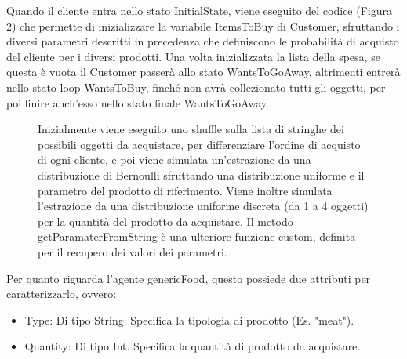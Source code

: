 \documentclass{article}
\begin{document}
Quando il cliente entra nello stato InitialState, viene eseguito del codice (Figura 2) che permette di inizializzare la variabile ItemsToBuy di Customer, sfruttando i diversi parametri descritti in precedenza che definiscono le probabilità di acquisto del cliente per i diversi prodotti.
\newline
\newline
Una volta inizializzata la lista della spesa, se questa è vuota il Customer passerà allo stato WantsToGoAway, altrimenti entrerà nello stato loop WantsToBuy, finché non avrà collezionato tutti gli oggetti, per poi finire anch'esso nello stato finale WantsToGoAway.
\begin{center}
\begin{figure}[h]
\label{init}

\caption{\footnotesize{Inizialmente viene eseguito uno shuffle sulla lista di stringhe dei possibili oggetti da acquistare, per differenziare l'ordine di acquisto di ogni cliente, e poi viene simulata un'estrazione da una distribuzione di Bernoulli sfruttando una distribuzione uniforme e il parametro del prodotto di riferimento. Viene inoltre simulata l'estrazione da una distribuzione uniforme discreta (da 1 a 4 oggetti) per la quantità del prodotto da acquistare. Il metodo \textsf{getParamaterFromString} è una ulteriore funzione custom, definita per il recupero dei valori dei parametri.}}
\end{figure}
\end{center}
Per quanto riguarda l'agente \textsf{genericFood}, questo possiede due attributi per caratterizzarlo, ovvero:
\begin{itemize}
\item \textsf{Type}: Di tipo String. Specifica la tipologia di prodotto (Es. "meat").
\item \textsf{Quantity}: Di tipo Int. Specifica la quantità di prodotto da acquistare.
\end{itemize}
\end{document}
